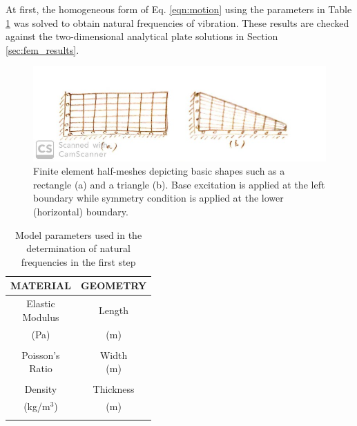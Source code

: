 \documentclass{article}
\begin{document}
 At first, the homogeneous form of Eq. \ref{eqn:motion}  using the parameters in Table \ref{tab:basicparams} was solved to obtain natural frequencies of vibration. These results are checked against the two-dimensional analytical plate solutions in Section \ref{sec:fem_results}.  
 
\begin{figure}
    \centering
\includegraphics[width=\linewidth]{figures/basicmesh}
    \caption{Finite element half-meshes depicting basic shapes such as a rectangle (a) and a triangle (b). Base excitation is applied at the left boundary while symmetry condition is applied at the lower (horizontal) boundary.}
    \label{fig:basicmesh}
\end{figure}

\begin{table}
    \centering
    \begin{tabular}{|c|c|} \hline
        \parbox{.8in}{\centering MATERIAL} & 
        \parbox{.8in}{\centering GEOMETRY} \\\hline
        \parbox{.8in}{\centering Elastic\\Modulus} & 
        \parbox{.8in}{\centering Length} \\
        (Pa) & (m) \\\hline
        &  \\\hline\hline
        \parbox{.8in}{\centering Poisson's\\Ratio} &
        \parbox{.8in}{\centering Width\\(m)} \\\hline
        &  \\\hline\hline
        \parbox{.8in}{\centering Density}  &
        \parbox{.8in}{\centering Thickness} \\
        (kg/m$^3$) & (m) \\\hline
        &  \\\hline
    \end{tabular}
    \caption{Model parameters used in the determination of natural frequencies in the first step}
    \label{tab:basicparams}
\end{table}
\end{document}
